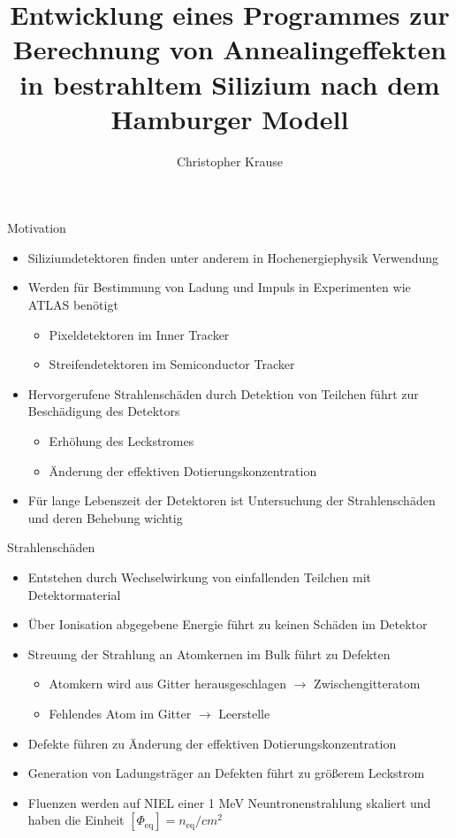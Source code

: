 \documentclass[aspectratio=1610, 9pt]{beamer}
\title{Entwicklung eines Programmes zur Berechnung von Annealingeffekten in bestrahltem Silizium nach dem Hamburger Modell}
\author[C.~Krause]{Christopher Krause}
\institute[E4]{Experimentelle Physik \\ Fakultät Physik}
\begin{document}
\maketitle




\begin{frame}{Motivation}
  \begin{itemize}
    \item Siliziumdetektoren finden unter anderem in Hochenergiephysik Verwendung
    \medskip
    \item Werden für Bestimmung von Ladung und Impuls in Experimenten wie ATLAS benötigt
      \begin{itemize}
        \item Pixeldetektoren im Inner Tracker
        \item Streifendetektoren im Semiconductor Tracker
      \end{itemize}
    \medskip
    \item Hervorgerufene Strahlenschäden durch Detektion von Teilchen führt zur Beschädigung des Detektors
      \begin{itemize}
        \item Erhöhung des Leckstromes
        \item Änderung der effektiven Dotierungskonzentration
      \end{itemize}
    \medskip
    \item Für lange Lebenszeit der Detektoren ist Untersuchung der Strahlenschäden und
          deren Behebung wichtig
  \end{itemize}
\end{frame}



\begin{frame}{Strahlenschäden}
  \begin{itemize}
    \item Entstehen durch Wechselwirkung von einfallenden Teilchen mit Detektormaterial
    \medskip
    \item Über Ionisation abgegebene Energie führt zu keinen Schäden im Detektor
    \medskip
    \item Streuung der Strahlung an Atomkernen im Bulk führt zu Defekten
      \begin{itemize}
        \item Atomkern wird aus Gitter herausgeschlagen $\rightarrow$ Zwischengitteratom
        \item Fehlendes Atom im Gitter $\rightarrow$ Leerstelle
      \end{itemize}
    \medskip
    \item Defekte führen zu Änderung der effektiven Dotierungskonzentration
    \medskip
    \item Generation von Ladungsträger an Defekten führt zu größerem Leckstrom
    \medskip
    \item Fluenzen werden auf NIEL einer 1 MeV Neuntronenstrahlung skaliert und haben die Einheit $ [\Phi_{\mathrm{eq}}] = n_{\mathrm{eq}} /cm^2$
  \end{itemize}
\end{frame}
\end{document}
